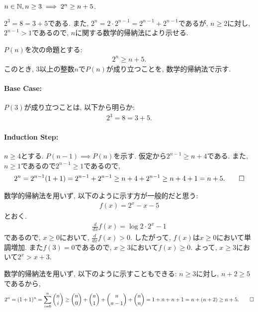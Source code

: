 \begin{prop}
  \label{p:20230810}
  $n\in\mathbb{N}, n\geq 3 \implies 2^n\geq n+5$.
\end{prop}
\begin{proof**}
  $2^3=8=3+5$である.
  また,
  $2^n=2\cdot 2^{n-1}=2^{n-1}+2^{n-1}$であるが,
  $n\geq 2$に対し,
  $2^{n-1} > 1$であるので,
  $n$に関する数学的帰納法により示せる.
\end{proof**}
\begin{proof*}
  $P(n)$を次の命題とする:
  \begin{align*}
    2^n\geq n+5
    .
  \end{align*}
  このとき,
  $3$以上の整数$n$で$P(n)$が成り立つことを,
  数学的帰納法で示す.

  \paragraph{Base Case:}
  $P(3)$が成り立つことは, 以下から明らか:
  \begin{align*}
    2^3=8=3+5.
  \end{align*}
  \paragraph{Induction Step:}
  $n\geq 4$とする.
  $P(n-1)\implies P(n)$を示す.
  仮定から$2^{n-1}\geq n+4$である.
  また, $n\geq 1$であるので$2^{n-1}\geq 1$であるので,
  \begin{align*}
    2^n=2^{n-1}(1+1)=2^{n-1}+2^{n-1}\geq n+4+2^{n-1}\geq n+4+1=n+5
    .\qedhere
  \end{align*}
\end{proof*}

\begin{rem}
  数学的帰納法を用いず, 以下のように示す方が一般的だと思う:
  \begin{align*}
    f(x)=2^x-x-5
  \end{align*}
  とおく.
  \begin{align*}
    \frac{d}{dx}f(x)=\log 2 \cdot 2^x-1
  \end{align*}
  であるので, $x\geq 0$において, $\frac{d}{dx}f(x)> 0$.
  したがって, $f(x)$は$x\geq 0$において単調増加.
  また$f(3)=0$であるので,
  $x\geq 3$において$f(x)\geq 0$.
  よって, $x\geq 3$において$2^x>x+3$.
\end{rem}

\begin{rem}
  数学的帰納法を用いず, 以下のように示すこともできる:
  $n\geq 3$に対し, $n+2\geq 5$であるから,
  \begin{align*}
    2^n=(1+1)^n=\sum_{i=0}^n \binom{n}{i}\geq \binom{n}{0}+\binom{n}{1}+\binom{n}{n-1}+\binom{n}{n}=1+n+n+1=n+(n+2)\geq n+5
    .\qedhere
  \end{align*}
\end{rem}


